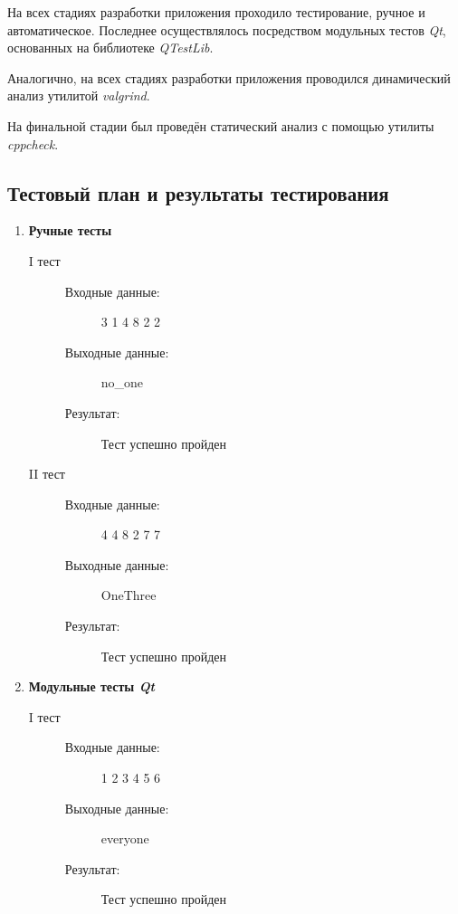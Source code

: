 \documentclass[12pt,a4paper]{report}
\begin{document}
На всех стадиях разработки приложения проходило тестирование, ручное и автоматическое. Последнее осуществлялось посредством модульных тестов \textit{Qt}, основанных на библиотеке  \textit{QTestLib}. 

Аналогично, на всех стадиях разработки приложения проводился динамический анализ утилитой \textit{valgrind}.

На финальной стадии был проведён статический анализ с помощью утилиты \textit{cppcheck}.
\subsection{Тестовый план и результаты тестирования}
\begin{enumerate}
\item \textbf{Ручные тесты}
\begin{description}
\item[I тест]
\hspace{\parindent}
\begin{flushleft}
\begin{description}
\item[Входные данные:] 3 1 4 8 2 2
\item[Выходные данные:] no\_one
\item[Результат:] Тест успешно пройден
\end{description}
\end{flushleft}
\end{description}

\begin{description}
\item[II тест]
\hspace{\parindent}
\begin{flushleft}
\begin{description}
\item[Входные данные:] 4 4 8 2 7 7
\item[Выходные данные:] OneThree
\item[Результат:] Тест успешно пройден
\end{description}
\end{flushleft}
\end{description}

\item \textbf{Модульные тесты \textit{Qt}}
\begin{description}
\item[I тест]
\hspace{\parindent}
\begin{flushleft}
\begin{description}
\item[Входные данные:] 1 2 3 4 5 6
\item[Выходные данные:] everyone
\item[Результат:] Тест успешно пройден
\end{description}
\end{flushleft}
\end{description}


\end{enumerate}
\end{document}

